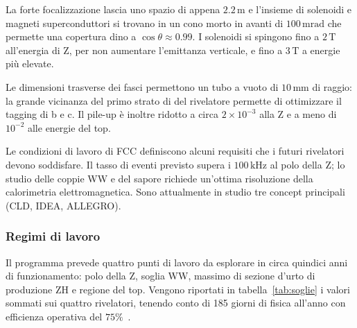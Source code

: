 La forte focalizzazione lascia uno spazio di appena $2.2\,\mathrm{m}$ e l'insieme di solenoidi e magneti superconduttori si trovano in un cono morto in avanti di $100\,\mathrm{mrad}$ che permette una copertura dino a $\cos\theta\approx0.99$. I solenoidi si spingono fino a $2\,\mathrm{T}$ all'energia di Z, per non aumentare l'emittanza verticale, e fino a $3\,\mathrm{T}$ a energie più elevate.

Le dimensioni trasverse dei fasci permettono un tubo a vuoto di $10\,\mathrm{mm}$ di raggio: la grande vicinanza del primo strato di del rivelatore permette di ottimizzare il tagging di b e c. Il pile-up è inoltre ridotto a circa $2\times10^{-3}$ alla Z e a meno di $10^{-2}$ alle energie del top.

Le condizioni di lavoro di FCC definiscono alcuni requisiti che i futuri rivelatori devono soddisfare. Il tasso di eventi previsto supera i $100\,\mathrm{kHz}$ al polo della Z; lo studio delle coppie WW e del sapore richiede un'ottima risoluzione della calorimetria elettromagnetica. Sono attualmente in studio tre concept principali (CLD, IDEA, ALLEGRO).

\subsubsection{Regimi di lavoro}
Il programma prevede quattro punti di lavoro da esplorare in circa quindici anni di funzionamento: polo della Z, soglia WW, massimo di sezione d'urto di produzione ZH e regione del top. Vengono riportati in tabella~\ref{tab:soglie} i valori sommati sui quattro rivelatori, tenendo conto di 185 giorni di fisica all'anno con efficienza operativa del $75\%$~\cite{FCC:FSR-v1}.

\begin{table}[hbtp]
    \centering
    \caption{Parametri operativi e prestazioni previste per i diversi punti di lavoro del FCC.}
    \label{tab:soglie} 
\end{table}

